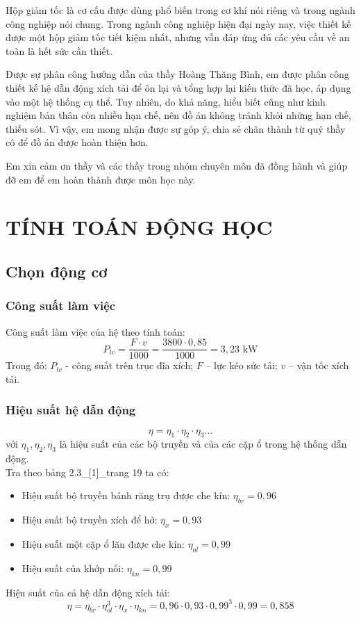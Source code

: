 \documentclass[12pt,a4paper]{report}
\begin{document}
Hộp giảm tốc là cơ cấu được dùng phổ biến trong cơ khí nói riêng và trong ngành công nghiệp nói chung. Trong ngành công nghiệp hiện đại ngày nay, việc thiết kế được một hộp giảm tốc tiết kiệm nhất, nhưng vẫn đáp ứng đủ các yêu cầu về an toàn là hết sức cần thiết.

Được sự phân công hướng dẫn của thầy Hoàng Thăng Bình, em được phân công thiết kế hệ dẫn động xích tải để ôn lại và tổng hợp lại kiến thức đã học, áp dụng vào một hệ thống cụ thể. Tuy nhiên, do khả năng, hiểu biết cũng như kinh nghiệm bản thân còn nhiều hạn chế, nên đồ án không tránh khỏi những hạn chế, thiếu sót. Vì vậy, em mong nhận được sự góp ý, chia sẻ chân thành từ quý thầy cô để đồ án được hoàn thiện hơn.

Em xin cảm ơn thầy và các thầy trong nhóm chuyên môn đã đồng hành và giúp đỡ em để em hoàn thành được môn học này.

\chapter{TÍNH TOÁN ĐỘNG HỌC}

\section{Chọn động cơ}

\subsection{Công suất làm việc}
Công suất làm việc của hệ theo tính toán:
$$P_{lv} = \frac{F \cdot v}{1000} = \frac{3800 \cdot 0{,}85}{1000} = 3{,}23 \text{ kW}$$
Trong đó: $P_{lv}$ - công suất trên trục đĩa xích; $F$ – lực kéo sức tải; $v$ – vận tốc xích tải.

\subsection{Hiệu suất hệ dẫn động}
$$\eta = \eta_1 \cdot \eta_2 \cdot \eta_3 \ldots$$
với $\eta_1, \eta_2, \eta_3$ là hiệu suất của các bộ truyền và của các cặp ổ trong hệ thống dẫn động.\\
Tra theo bảng 2.3\_[1]\_trang 19 ta có:
\begin{itemize}
    \item Hiệu suất bộ truyền bánh răng trụ được che kín: $\eta_{br} = 0{,}96$
    \item Hiệu suất bộ truyền xích để hở: $\eta_{x} = 0{,}93$
    \item Hiệu suất một cặp ổ lăn được che kín: $\eta_{ol} = 0{,}99$
    \item Hiệu suất của khớp nối: $\eta_{kn} = 0{,}99$
\end{itemize}
Hiệu suất của cả hệ dẫn động xích tải:
$$\eta = \eta_{br} \cdot \eta_{ol}^3 \cdot \eta_{x} \cdot \eta_{kn} = 0{,}96 \cdot 0{,}93 \cdot 0{,}99^3 \cdot 0{,}99 = 0{,}858$$
\end{document}
